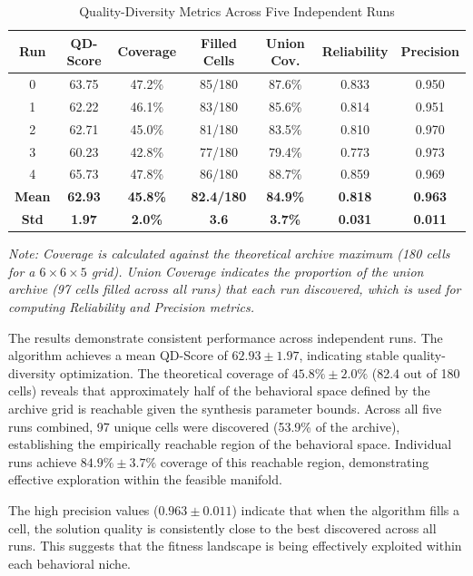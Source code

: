 \begin{table}[htbp]
\centering
\caption{Quality-Diversity Metrics Across Five Independent Runs}
\label{tab:qd_results}
\begin{tabular}{ccccccc}
\toprule
\textbf{Run} & \textbf{QD-Score} & \textbf{Coverage} & \textbf{Filled Cells} & \textbf{Union Cov.} & \textbf{Reliability} & \textbf{Precision} \\
\midrule
0 & 63.75 & 47.2\% & 85/180 & 87.6\% & 0.833 & 0.950 \\
1 & 62.22 & 46.1\% & 83/180 & 85.6\% & 0.814 & 0.951 \\
2 & 62.71 & 45.0\% & 81/180 & 83.5\% & 0.810 & 0.970 \\
3 & 60.23 & 42.8\% & 77/180 & 79.4\% & 0.773 & 0.973 \\
4 & 65.73 & 47.8\% & 86/180 & 88.7\% & 0.859 & 0.969 \\
\midrule
\textbf{Mean} & \textbf{62.93} & \textbf{45.8\%} & \textbf{82.4/180} & \textbf{84.9\%} & \textbf{0.818} & \textbf{0.963} \\
\textbf{Std} & \textbf{1.97} & \textbf{2.0\%} & \textbf{3.6} & \textbf{3.7\%} & \textbf{0.031} & \textbf{0.011} \\
\bottomrule
\end{tabular}
\end{table}

\noindent\textit{Note: Coverage is calculated against the theoretical archive maximum (180 cells for a $6 \times 6 \times 5$ grid). Union Coverage indicates the proportion of the union archive (97 cells filled across all runs) that each run discovered, which is used for computing Reliability and Precision metrics.}

\vspace{0.5em}

The results demonstrate consistent performance across independent runs. The algorithm achieves a mean QD-Score of $62.93 \pm 1.97$, indicating stable quality-diversity optimization. The theoretical coverage of $45.8\% \pm 2.0\%$ (82.4 out of 180 cells) reveals that approximately half of the behavioral space defined by the archive grid is reachable given the synthesis parameter bounds. Across all five runs combined, 97 unique cells were discovered (53.9\% of the archive), establishing the empirically reachable region of the behavioral space. Individual runs achieve $84.9\% \pm 3.7\%$ coverage of this reachable region, demonstrating effective exploration within the feasible manifold.

The high precision values ($0.963 \pm 0.011$) indicate that when the algorithm fills a cell, the solution quality is consistently close to the best discovered across all runs. This suggests that the fitness landscape is being effectively exploited within each behavioral niche.

